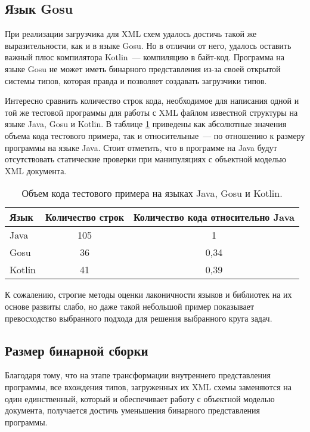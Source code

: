 \subsection{Язык Gosu}\label{xml-gosu-result}
При реализации загрузчика для XML схем удалось достичь такой же выразительности, как и в языке Gosu.
Но в отличии от него, удалось оставить важный плюс компилятора Kotlin~--- компиляцию в байт-код.
Программа на языке Gosu не может иметь бинарного представления из-за своей открытой системы типов,
которая правда и позволяет создавать загрузчики типов.

Интересно сравнить количество строк кода, необходимое для написания одной и той же тестовой программы для работы с XML файлом известной структуры на языке Java, Gosu и Kotlin.
В таблице \ref{tab:comparation_java_gosu_kotlin} приведены как абсолютные значения объема кода тестового примера, так и относительные~--- по отношению к размеру программы на языке Java.
Стоит отметить, что в программе на Java будут отсутствовать статические проверки при манипуляциях с объектной моделью XML документа.

\begin{table}[!h]\begin{center}
\begin{center}
    \begin{tabular}{ | l | c | c | }
    \hline
    Язык 	& Количество строк & Количество кода относительно Java \\ \hline
    Java 	& 105 	& 1 \\ \hline
    Gosu   	& 36 	& 0,34  \\ \hline
    Kotlin 	& 41 	& 0,39 \\
    \hline
    \end{tabular}
\end{center}
\caption{Объем кода тестового примера на языках Java, Gosu и Kotlin.}
\label{tab:comparation_java_gosu_kotlin}
\end{center}
\end{table}

К сожалению, строгие методы оценки лаконичности языков и библиотек на их основе развиты слабо, но даже такой небольшой пример показывает превосходство выбранного подхода для решения выбранного круга задач.

\subsection{Размер бинарной сборки}
Благодаря тому, что на этапе трансформации внутреннего представления программы, все вхождения типов, загруженных их XML схемы заменяются на один единственный, который и обеспечивает работу с объектной моделью документа, получается достичь уменьшения бинарного представления программы.


